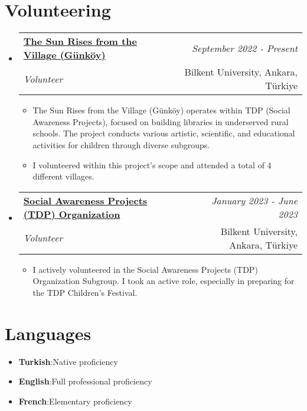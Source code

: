 \documentclass[a4paper,11pt]{article}
\makeatletter
\newcommand{\resumeItem}[2]{
    \item{\textbf{#1}{:\hspace{0.5mm}#2 \vspace{-0.5mm}}}
}
\newcommand{\resumeSubheading}[4]{
\vspace{0.5mm}\item
    \begin{tabular*}{0.98\textwidth}[t]{l@{\extracolsep{\fill}}r}
    \textbf{#1} & \textit{\footnotesize{#4}} \\
    \textit{\footnotesize{#3}} &  \footnotesize{#2} \\
    \end{tabular*}\vspace{-2.4mm}
}
\newcommand{\resumeSubItem}[2]{\resumeItem{#1}{#2}\vspace{-4pt}}
\newcommand{\resumeSubHeadingListStart}{\begin{itemize}[leftmargin=*,labelsep=0mm]}
\newcommand{\resumeHeadingSkillStart}{\begin{itemize}[leftmargin=*,itemsep=1.7mm, rightmargin=2ex]}
\newcommand{\resumeItemListStart}{\begin{justify}\begin{itemize}[leftmargin=3ex, rightmargin=2ex, noitemsep,labelsep=1.2mm,itemsep=0mm]\small}
\newcommand{\resumeSubHeadingListEnd}{\end{itemize}\vspace{2mm}}
\newcommand{\resumeHeadingSkillEnd}{\end{itemize}\vspace{-2mm}}
\newcommand{\resumeItemListEnd}{\end{itemize}\end{justify}\vspace{-2mm}}
\makeatother
\begin{document}

\section{\textbf{Volunteering}}
    \resumeSubHeadingListStart
        \resumeSubheading
            {\href{https://w3.bilkent.edu.tr/www/ogrenci-dekanligi/toplumsal-duyarlilik-projeleri/}{The Sun Rises from the Village (Günköy)}}{Bilkent University, Ankara, Türkiye}
            {Volunteer}{September 2022 - Present}
                \resumeItemListStart
                    \item The Sun Rises from the Village (Günköy) operates within TDP (Social Awareness Projects), focused on building libraries in underserved rural schools. The project conducts various artistic, scientific, and educational activities for children through diverse subgroups. 
                    \item {I volunteered within this project's scope and attended a total of 4 different villages.}
                \resumeItemListEnd
        \resumeSubheading
            {\href{https://w3.bilkent.edu.tr/www/ogrenci-dekanligi/toplumsal-duyarlilik-projeleri/}{Social Awareness Projects (TDP) Organization}}{Bilkent University, Ankara, Türkiye}
            {Volunteer}{January 2023 - June 2023}
                \resumeItemListStart
                    \item I actively volunteered in the Social Awareness Projects (TDP) Organization Subgroup. I took an active role, especially in preparing for the TDP Children’s Festival.
                \resumeItemListEnd
    \resumeSubHeadingListEnd
\vspace{-6.5mm}


\section{\textbf{Languages}}
    \resumeHeadingSkillStart
        \resumeSubItem{Turkish} {Native proficiency}
        \resumeSubItem{English} {Full professional proficiency}
        \resumeSubItem{French} {Elementary proficiency}
    \resumeHeadingSkillEnd

\vspace{-1mm}

\end{document}
